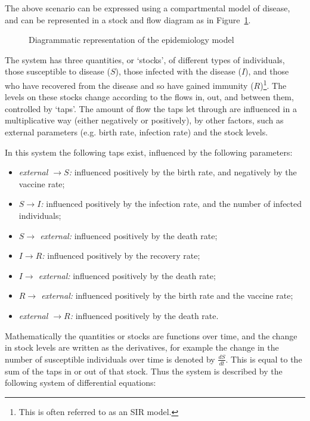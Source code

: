 The above scenario can be expressed using a compartmental model of disease, and
can be represented in a stock and flow diagram as
in Figure~\ref{fig:stockflow}.

\begin{figure}
    \begin{center}
        
        \caption{Diagrammatic representation of the epidemiology model}
        \label{fig:stockflow}
    \end{center}
\end{figure}

The system has three quantities, or `stocks', of different types of individuals,
those susceptible to disease ($S$), those infected with the disease ($I$), and
those who have recovered from the disease and so have gained immunity
($R$)\footnote{This is often referred to as an SIR model.}. The
levels on these stocks change according to the flows in, out, and between them,
controlled by `taps'. The amount of flow the taps let through are influenced in
a multiplicative way (either negatively or positively), by other factors, such
as external parameters (e.g. birth rate, infection rate) and the stock levels.

In this system the following taps exist, influenced by the following parameters:

\begin{itemize}
  \item \textit{external $\rightarrow S$:} influenced positively by the birth
  rate, and negatively by the vaccine rate;
  \item \textit{$S \rightarrow I$:} influenced positively by the infection rate,
  and the number of infected individuals;
  \item \textit{$S \rightarrow$ external:} influenced positively by the death
  rate;
  \item \textit{$I \rightarrow R$:} influenced positively by the recovery rate;
  \item \textit{$I \rightarrow$ external:} influenced positively by the death
  rate;
  \item \textit{$R \rightarrow$ external:} influenced positively by the birth
  rate and the vaccine rate;
  \item \textit{external $\rightarrow R$:} influenced positively by the death
  rate.
\end{itemize}

Mathematically the quantities or stocks are functions over time, and the change
in stock levels are written as the derivatives, for example
the change in the number of susceptible individuals over time is denoted by
$\frac{dS}{dt}$. This is equal to the sum of the taps in or out of that stock.
Thus the system is described by the following system of differential
equations:

